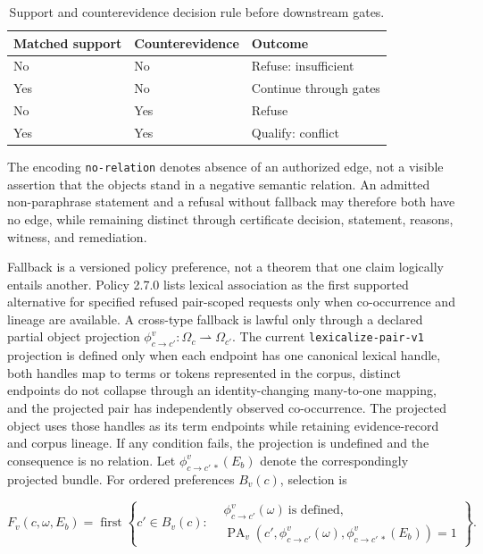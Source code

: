 \documentclass[manuscript,screen,review,anonymous]{acmart}
\begin{document}
\begin{table}[t]
  \caption{Support and counterevidence decision rule before downstream gates.}
  \label{tab:counterevidence}
  \centering
  \small
  \begin{tabular}{lll}
    \toprule
    Matched support & Counterevidence & Outcome \\
    \midrule
    No & No & Refuse: insufficient \\
    Yes & No & Continue through gates \\
    No & Yes & Refuse \\
    Yes & Yes & Qualify: conflict \\
    \bottomrule
  \end{tabular}
\end{table}

The encoding \texttt{no-relation} denotes absence of an authorized edge, not a visible assertion that the objects stand in a negative semantic relation. An admitted non-paraphrase statement and a refusal without fallback may therefore both have no edge, while remaining distinct through certificate decision, statement, reasons, witness, and remediation.

Fallback is a versioned policy preference, not a theorem that one claim logically entails another. Policy 2.7.0 lists lexical association as the first supported alternative for specified refused pair-scoped requests only when co-occurrence and lineage are available. A cross-type fallback is lawful only through a declared partial object projection $\phi^v_{c\rightarrow c'}:\Omega_c\rightharpoonup\Omega_{c'}$. The current \texttt{lexicalize-pair-v1} projection is defined only when each endpoint has one canonical lexical handle, both handles map to terms or tokens represented in the corpus, distinct endpoints do not collapse through an identity-changing many-to-one mapping, and the projected pair has independently observed co-occurrence. The projected object uses those handles as its term endpoints while retaining evidence-record and corpus lineage. If any condition fails, the projection is undefined and the consequence is no relation. Let $\phi^v_{c\rightarrow c'\,*}(E_b)$ denote the correspondingly projected bundle. For ordered preferences $B_v(c)$, selection is

\begin{equation}
F_v(c,\omega,E_b)=\operatorname{first}\left\{c'\in B_v(c):
\begin{aligned}
&\phi^v_{c\rightarrow c'}(\omega)\ \text{is defined},\\
&\operatorname{PA}_v\!\left(c',\phi^v_{c\rightarrow c'}(\omega),\phi^v_{c\rightarrow c'\,*}(E_b)\right)=1
\end{aligned}\right\}.
\label{eq:fallback}
\end{equation}
\end{document}
